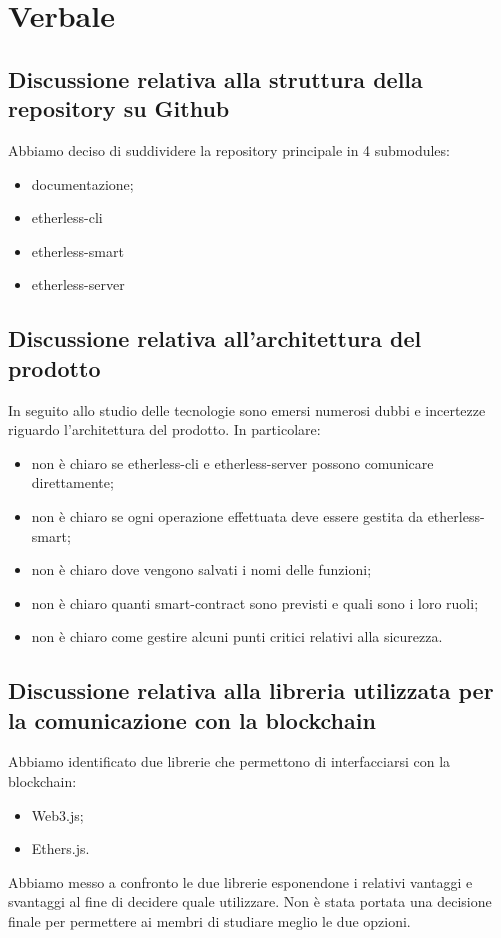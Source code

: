 \section{Verbale}

	\subsection{Discussione relativa alla struttura della repository su Github}
	Abbiamo deciso di suddividere la repository principale in 4 submodules:
	\begin{itemize}
		\item documentazione;
		\item etherless-cli
		\item etherless-smart
		\item etherless-server
	\end{itemize}
	

	\subsection{Discussione relativa all'architettura del prodotto}
	In seguito allo studio delle tecnologie sono emersi numerosi dubbi e incertezze riguardo l'architettura del prodotto.
	In particolare:
	\begin{itemize}
		\item non è chiaro se etherless-cli e etherless-server possono comunicare direttamente;
		\item non è chiaro se ogni operazione effettuata deve essere gestita da etherless-smart;
		\item non è chiaro dove vengono salvati i nomi delle funzioni;
		\item non è chiaro quanti smart-contract sono previsti e quali sono i loro ruoli;
		\item non è chiaro come gestire alcuni punti critici relativi alla sicurezza.
	\end{itemize}

	\subsection{Discussione relativa alla libreria utilizzata per la comunicazione con la blockchain}
	Abbiamo identificato due librerie che permettono di interfacciarsi con la blockchain:
	\begin{itemize}
		\item Web3.js;
		\item Ethers.js.
	\end{itemize}
	Abbiamo messo a confronto le due librerie esponendone i relativi vantaggi e svantaggi al fine di decidere quale utilizzare.
	Non è stata portata una decisione finale per permettere ai membri di studiare meglio le due opzioni.
	
